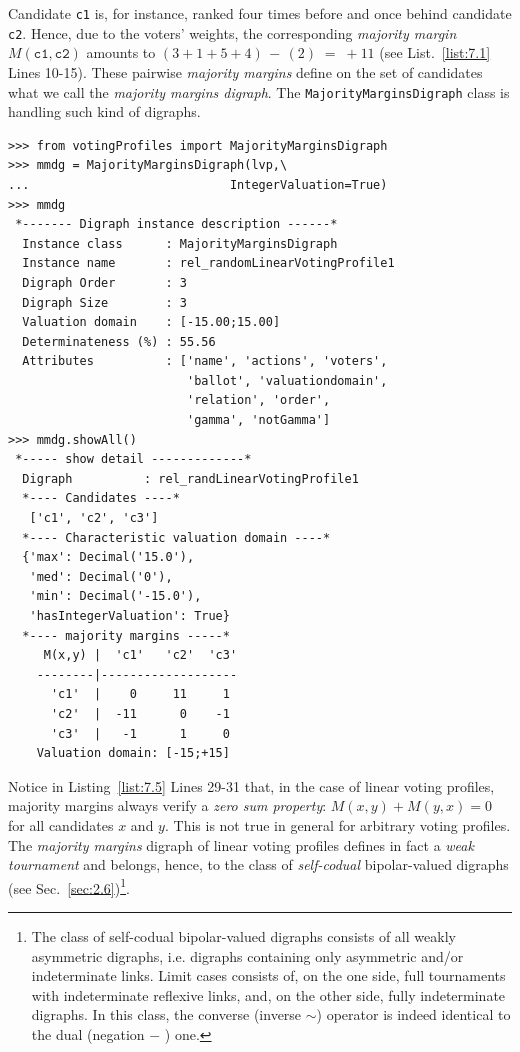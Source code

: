 Candidate \texttt{c1} is, for instance, ranked four times before and once behind candidate \texttt{c2}. Hence, due to the voters' weights, the corresponding \emph{majority margin} $M(\mathtt{c1},\mathtt{c2})$ amounts to  $(3+1+5+4)\, -\,(2)\; =\; +11$ (see List.~\vref{list:7.1} Lines 10-15). These pairwise \emph{majority margins} define on the set of candidates what we call the \emph{majority margins digraph}. The \texttt{MajorityMarginsDigraph} class is handling such kind of digraphs.
\begin{lstlisting}[caption={Example of \emph{Majority Margins} digraph},label=list:7.5]
>>> from votingProfiles import MajorityMarginsDigraph
>>> mmdg = MajorityMarginsDigraph(lvp,\
...                            IntegerValuation=True)
>>> mmdg
 *------- Digraph instance description ------*
  Instance class      : MajorityMarginsDigraph
  Instance name       : rel_randomLinearVotingProfile1
  Digraph Order       : 3
  Digraph Size        : 3
  Valuation domain    : [-15.00;15.00]
  Determinateness (%) : 55.56
  Attributes          : ['name', 'actions', 'voters',
                         'ballot', 'valuationdomain',
                         'relation', 'order',
                         'gamma', 'notGamma']
>>> mmdg.showAll()
 *----- show detail -------------*
  Digraph          : rel_randLinearVotingProfile1
  *---- Candidates ----*
   ['c1', 'c2', 'c3']
  *---- Characteristic valuation domain ----*
  {'max': Decimal('15.0'),
   'med': Decimal('0'),
   'min': Decimal('-15.0'),
   'hasIntegerValuation': True}
  *---- majority margins -----*
     M(x,y) |  'c1'   'c2'  'c3'	  
    --------|-------------------
      'c1'  |    0     11     1	 
      'c2'  |  -11      0    -1	 
      'c3'  |   -1      1     0	 
    Valuation domain: [-15;+15]
\end{lstlisting}

Notice in Listing~\ref{list:7.5} Lines 29-31 that, in the case of linear voting profiles, majority margins always verify a \emph{zero sum property}: $M(x,y) + M(y,x) = 0$ for all candidates $x$ and $y$. This is not true in general for arbitrary voting profiles. The \emph{majority margins} digraph of linear voting profiles defines in fact a \emph{weak tournament} and belongs, hence, to the class of \emph{self-codual} bipolar-valued digraphs (see Sec.~\ref{sec:2.6})\footnote{The class of self-codual bipolar-valued digraphs consists of all weakly asymmetric digraphs, i.e. digraphs containing only asymmetric and/or indeterminate links. Limit cases consists of, on the one side, full tournaments with indeterminate reflexive links, and, on the other side, fully indeterminate digraphs. In this class, the converse (inverse $\sim$) operator is indeed identical to the dual (negation $-$ ) one.}.
    
